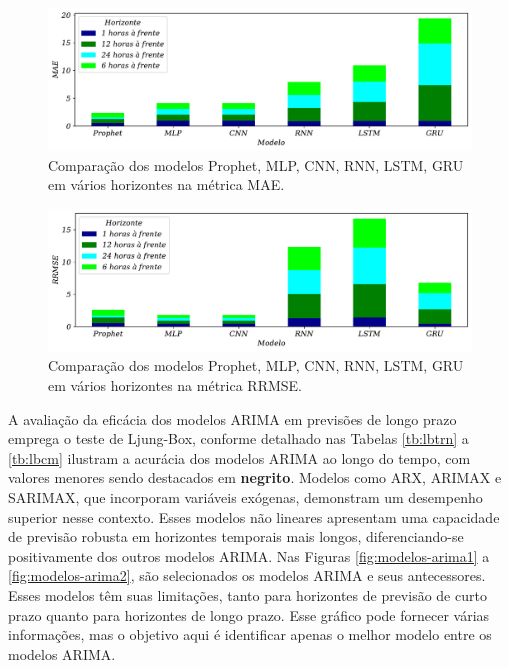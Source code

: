 \begin{figure}[H]
	\centering
	\caption{Comparação dos modelos Prophet, MLP, CNN, RNN, LSTM, GRU em vários horizontes na métrica MAE.}\label{fig:modelos-red}
	\includegraphics[width=0.9\linewidth]{Resultados/Figuras/mae_comparar}
	
	
\end{figure}



\begin{figure}[H]
	\centering
	\caption{Comparação dos modelos Prophet, MLP, CNN, RNN, LSTM, GRU em vários horizontes na métrica RRMSE.}\label{fig:modelos-red2}
	\includegraphics[width=0.9\linewidth]{Resultados/Figuras/rrmse_comparar}
	
	
\end{figure}

A avaliação da eficácia dos modelos ARIMA em previsões de longo prazo emprega o teste de Ljung-Box, conforme detalhado nas Tabelas \ref{tb:lbtrn} a \ref{tb:lbcm} ilustram a acurácia dos modelos ARIMA ao longo do tempo, com valores menores sendo destacados em \textbf{negrito}. Modelos como ARX, ARIMAX e SARIMAX, que incorporam variáveis exógenas, demonstram um desempenho superior nesse contexto. Esses modelos não lineares apresentam uma capacidade de previsão robusta em horizontes temporais mais longos, diferenciando-se positivamente dos outros modelos ARIMA. Nas Figuras \ref{fig:modelos-arima1} a \ref{fig:modelos-arima2}, são selecionados os modelos ARIMA e seus antecessores. Esses modelos têm suas limitações, tanto para horizontes de previsão de curto prazo quanto para horizontes de longo prazo. Esse gráfico pode fornecer várias informações, mas o objetivo aqui é identificar apenas o melhor modelo entre os modelos ARIMA.

